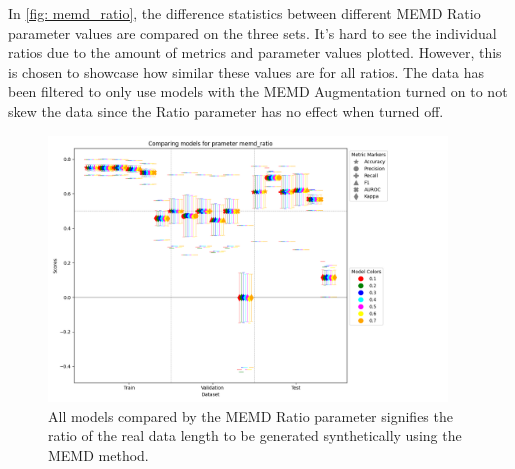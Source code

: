 In \autoref{fig: memd_ratio}, the difference statistics between different MEMD Ratio parameter values are compared on the three sets. It's hard to see the individual ratios due to the amount of metrics and parameter values plotted. However, this is chosen to showcase how similar these values are for all ratios. The data has been filtered to only use models with the MEMD Augmentation turned on to not skew the data since the Ratio parameter has no effect when turned off.

\begin{figure}[H]
    \centering
    \includegraphics[width=400px]{Figures/results/memd_ratio/memd_ratio.png}
    \caption{All models compared by the MEMD Ratio parameter signifies the ratio of the real data length to be generated synthetically using the MEMD method. }
    \label{fig: memd_ratio}
\end{figure}
